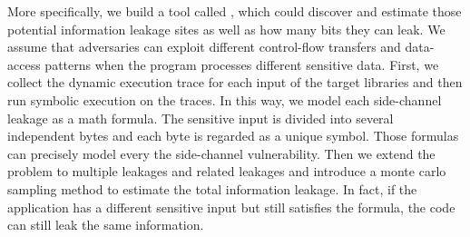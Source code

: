 More specifically, we build a tool called \tool{}, which could discover and estimate those potential information leakage sites 
as well as how many bits they can leak. 
We assume that adversaries can exploit different control-flow transfers and data-access patterns when 
the program processes different sensitive data. 
First, we collect the dynamic execution trace for each input of the target libraries 
and then run symbolic execution on the traces. 
In this way, we model each side-channel leakage as a math formula. 
The sensitive input is divided into several independent bytes and each byte is regarded as 
a unique symbol. Those formulas can precisely model every the side-channel vulnerability.
Then we extend the problem to multiple leakages and related leakages
and introduce a monte carlo sampling method to estimate the total information leakage.
In fact, if the application has a different sensitive input but still satisfies the formula, 
the code can still leak the same information. 





